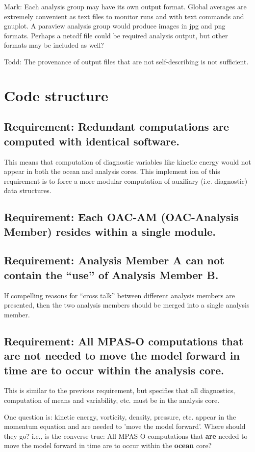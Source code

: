 \documentclass[11pt]{report}
\begin{document}
Mark: Each analysis group may have its own output format.  
Global averages are extremely convenient as text files to monitor runs and with text commands and gnuplot.  A paraview analysis group would produce images in jpg and png formats.  Perhaps a netcdf file could be required analysis output, but other formats may be included as well?

Todd: The provenance of output files that are not self-describing is not sufficient. 

\newpage
\section{Code structure}
\subsection{{\color{green} Requirement:} Redundant computations are computed with identical software.}
This means that computation of diagnostic variables like kinetic energy would not appear in both the ocean and analysis cores. This implement ion of this requirement is to force a more modular computation of auxiliary (i.e. diagnostic) data structures.

\subsection{{\color{red} Requirement:} Each OAC-AM (OAC-Analysis Member) resides within a single module.}

\subsection{{\color{red} Requirement:} Analysis Member A can not contain the ``use'' of Analysis Member B.}
If compelling reasons for ``cross talk'' between different analysis members are presented, then the two analysis members should be merged into a single analysis member.

\subsection{{\color{red} Requirement:} All MPAS-O computations that are not needed to move the model forward in time are to occur within the analysis core.}
This is similar to the previous requirement, but specifies that all diagnostics, computation of means and variability, etc. must be in the analysis core.  

One question is: kinetic energy, vorticity, density, pressure, etc. appear in the momentum equation and are needed to 'move the model forward'.  Where should they go?  i.e., is the converse true: All MPAS-O computations that {\bf are} needed to move the model forward in time are to occur within the {\bf ocean} core?
\end{document}
